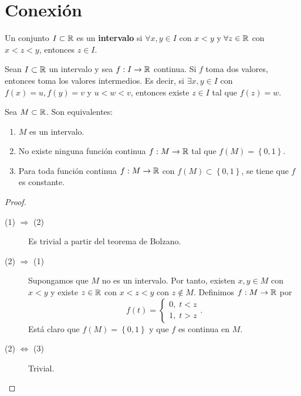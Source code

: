 \section{Conexión}
\begin{definition}[Intervalo]
Un conjunto $\displaystyle I \subset \mathbb{R} $ es un \textbf{intervalo} si $\displaystyle \forall x,y \in I $ con $\displaystyle x < y $ y $\displaystyle \forall z \in \mathbb{R} $ con $\displaystyle x < z < y $, entonces $\displaystyle z \in I $.
\end{definition}
\begin{theorem}
Sean $\displaystyle I \subset \mathbb{R} $ un intervalo y sea $\displaystyle f : I \to \mathbb{R} $ continua. Si $\displaystyle f $ toma dos valores, entonces toma los valores intermedios. Es decir, si $\displaystyle \exists x,y \in I $ con $\displaystyle f\left(x\right) = u, f\left(y\right) = v $ y $\displaystyle u < w < v $, entonces existe $\displaystyle z \in I $ tal que $\displaystyle f\left(z\right) = w $.
\end{theorem}
\begin{colorary}
Sea $\displaystyle M \subset \mathbb{R} $. Son equivalentes:
\begin{enumerate}
\item $\displaystyle M $ es un intervalo.
\item No existe ninguna función continua $\displaystyle f : M \to \mathbb{R} $ tal que $\displaystyle f\left(M\right) = \left\{ 0,1\right\}  $. 
\item Para toda función continua $\displaystyle f : M \to \mathbb{R} $ con $\displaystyle f\left(M\right) \subset \left\{ 0,1\right\}  $, se tiene que $\displaystyle f $ es constante. 
\end{enumerate}
\end{colorary}
\begin{proof}
\begin{description}
\item[(1) $\displaystyle \Rightarrow $ (2)] Es trivial a partir del teorema de Bolzano. 
\item[(2) $\displaystyle \Rightarrow $ (1)] Supongamos que $\displaystyle M $ no es un intervalo. Por tanto, existen $\displaystyle x,y \in M $ con $\displaystyle x < y $ y existe $\displaystyle z \in \mathbb{R} $ con $\displaystyle x < z < y $ con $\displaystyle z \not\in M $. Definimos $\displaystyle f : M \to \mathbb{R} $ por 
	\[f\left(t\right) =
	\begin{cases}
	0, \; t < z \\ 
	1, \; t > z
	\end{cases}
	.\]
	Está claro que $\displaystyle f\left(M\right) = \left\{ 0,1\right\}  $ y que $\displaystyle f $ es continua en $\displaystyle M $. 
\item[(2) $\displaystyle \iff $ (3)] Trivial.
\end{description}
\end{proof}
